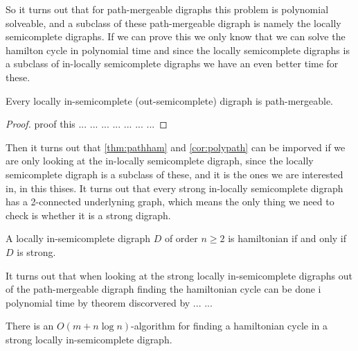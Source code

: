 So it turns out that for path-mergeable digraphs this problem is polynomial solveable, and a subclass of these path-mergeable digraph is namely the locally semicomplete digraphs. If we can prove this we only know that we can solve the hamilton cycle in polynomial time and since the locally semicomplete digraphs is a subclass of in-locally semicomplete digraphs we have an even better time for these.
\begin{proposition}
    Every locally in-semicomplete (out-semicomplete) digraph is path-mergeable.
\end{proposition}
\begin{proof}
    proof this ... ... ... ... ... ... ... 
\end{proof}

Then it turns out that \autoref{thm:pathham} and \autoref{cor:polypath} can be imporved if we are only looking at the in-locally semicomplete digraph, since the locally semicomplete digraph is a subclass of these, and it is the ones we are interested in, in this thises. It turns out that every strong in-locally semicomplete digraph has a 2-connected underlyning graph, which means the only thing we need to check is whether it is a strong digraph.
\begin{thm}
    A locally in-semicomplete digraph $D$ of order $n\geq 2$ is hamiltonian if and only if $D$ is strong.
\end{thm}

It turns out that when looking at the strong locally in-semicomplete digraphs out of the path-mergeable digraph finding the hamiltonian cycle can be done i polynomial time by theorem discorvered by ... ...
\begin{thm}
    There is an $O(m+n\log n)$-algorithm for finding a hamiltonian cycle in a strong locally in-semicomplete digraph.
\end{thm}


